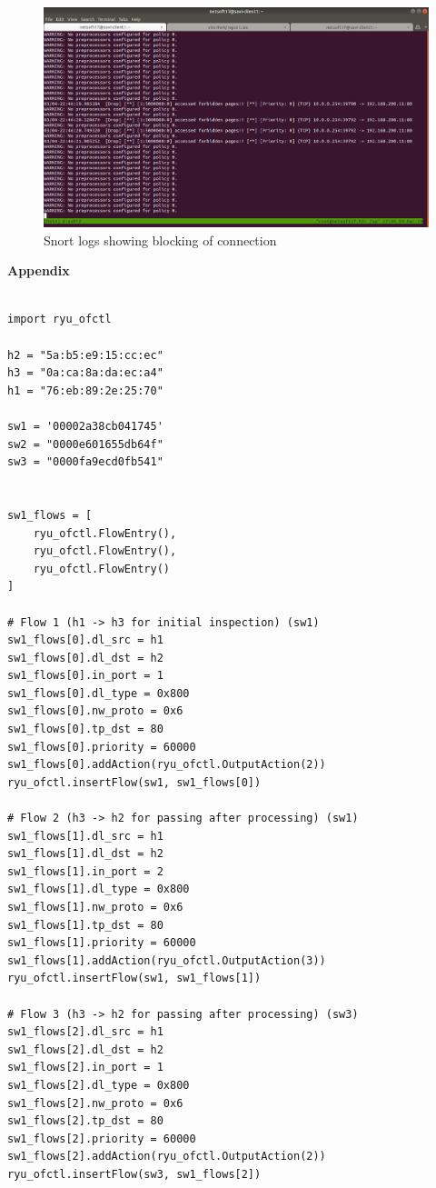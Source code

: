 \documentclass[12pt]{article}
\begin{document}
\begin{figure}[h]
	\centering
	\includegraphics[scale=0.3]{snort-blocking}
	\caption{Snort logs showing blocking of connection}
\end{figure}

\clearpage

\textbf{Appendix}

\begin{verbatim}

import ryu_ofctl

h2 = "5a:b5:e9:15:cc:ec"
h3 = "0a:ca:8a:da:ec:a4"
h1 = "76:eb:89:2e:25:70"

sw1 = '00002a38cb041745'
sw2 = "0000e601655db64f"
sw3 = "0000fa9ecd0fb541"


sw1_flows = [
    ryu_ofctl.FlowEntry(),
    ryu_ofctl.FlowEntry(),
    ryu_ofctl.FlowEntry()
]

# Flow 1 (h1 -> h3 for initial inspection) (sw1)
sw1_flows[0].dl_src = h1
sw1_flows[0].dl_dst = h2
sw1_flows[0].in_port = 1
sw1_flows[0].dl_type = 0x800
sw1_flows[0].nw_proto = 0x6
sw1_flows[0].tp_dst = 80
sw1_flows[0].priority = 60000
sw1_flows[0].addAction(ryu_ofctl.OutputAction(2))
ryu_ofctl.insertFlow(sw1, sw1_flows[0])

# Flow 2 (h3 -> h2 for passing after processing) (sw1)
sw1_flows[1].dl_src = h1
sw1_flows[1].dl_dst = h2
sw1_flows[1].in_port = 2
sw1_flows[1].dl_type = 0x800
sw1_flows[1].nw_proto = 0x6
sw1_flows[1].tp_dst = 80
sw1_flows[1].priority = 60000
sw1_flows[1].addAction(ryu_ofctl.OutputAction(3))
ryu_ofctl.insertFlow(sw1, sw1_flows[1])

# Flow 3 (h3 -> h2 for passing after processing) (sw3)
sw1_flows[2].dl_src = h1
sw1_flows[2].dl_dst = h2
sw1_flows[2].in_port = 1
sw1_flows[2].dl_type = 0x800
sw1_flows[2].nw_proto = 0x6
sw1_flows[2].tp_dst = 80
sw1_flows[2].priority = 60000
sw1_flows[2].addAction(ryu_ofctl.OutputAction(2))
ryu_ofctl.insertFlow(sw3, sw1_flows[2])
\end{verbatim}
\end{document}
